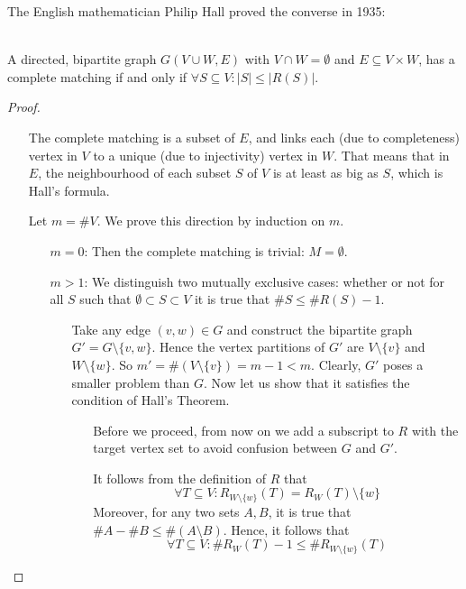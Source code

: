 The English mathematician Philip Hall proved the converse in 1935:
\begin{theorem} \label{hall}~\\
A directed, bipartite graph $G(V \cup W,E)$ with $V \cap W =
\emptyset$ and $E \subseteq V \times W$, has a complete matching if and
only if $\forall S \subseteq V: |S| \leq |R(S)|$.
\end{theorem}
\begin{proof}~  %
\begin{itemize}

\item[\fbox{$\Rightarrow$}]
The complete matching is a subset of $E$, and links each (due to completeness) vertex in $V$ to a unique (due to injectivity) vertex in $W$. That means that in $E$, the neighbourhood of each subset $S$ of $V$ is at least as big as $S$, which is Hall's formula.

\item[\fbox{$\Leftarrow$}]
Let $m = \#V$. We prove this direction by induction on $m$.
\begin{itemize}
\item[\underline{$m=0$}:] Then the complete matching is trivial: $M = \emptyset$.
\item[\underline{$m>1$}:] 
We distinguish two mutually exclusive cases: whether or not 
for all $S$ such that $\emptyset \subset S \subset V$ it
is true that $\#S \leq \#R(S) - 1$.
\begin{itemize}
\item[\dashuline{$\forall S: \emptyset \subset S \subset V \Rightarrow \#S \leq
\#R(S) - 1$:}] Take any edge $(v,w) \in G$ and construct the bipartite graph
$G' = G \setminus \{v,w\}$. Hence the vertex partitions of $G'$ are $V
\setminus \{v\}$ and $W \setminus \{w\}$. So $m' = \#(V \setminus \{v\}) = m - 1 < m$.
Clearly, $G'$ poses a smaller problem than $G$. Now let us show that it satisfies
the condition of Hall's Theorem.
\begin{itemize}
\item[]
Before we proceed, from now on we add a subscript to $R$ with the target vertex
set to avoid confusion between $G$ and $G'$. 

It follows from the definition of $R$ that 
\[ \forall T \subseteq V: R_{W \setminus \{w\}}(T) = R_W(T) \setminus \{ w\}\] 
Moreover, for any two sets $A, B$, it is true that $\#A - \#B \leq \#(A
\setminus B)$. Hence, it follows that
\[ \forall T \subseteq V:  \#R_W(T) - 1 \leq \#R_{W \setminus \{w\}}(T)\] 


\end{itemize}
\end{itemize}
\end{itemize}
\end{itemize}
\end{proof}
